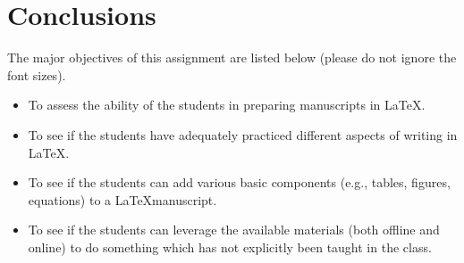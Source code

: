 \documentclass[11pt]{article}
\begin{document}
 \section{Conclusions}
 The major objectives of this assignment are listed below (please do not ignore the font sizes).
 \begin{itemize}
     \item \begin{huge} To assess the ability of the students in preparing manuscripts in  \LaTeX. \end{huge}
     \pagebreak
     \item \begin{Large} To see if the students have adequately practiced different aspects of writing in  \LaTeX . \end{Large}
     \item \begin{large} To see if the students can add various basic components (e.g., tables, figures, equations) to a 
     \LaTeX \space manuscript. \end{large}
      \item \begin{normalsize} To see if the students can leverage the available materials (both offline and online) to do something which has not explicitly been taught in the class. \end{normalsize}
 \end{itemize}
\printbibliography
\end{document}
